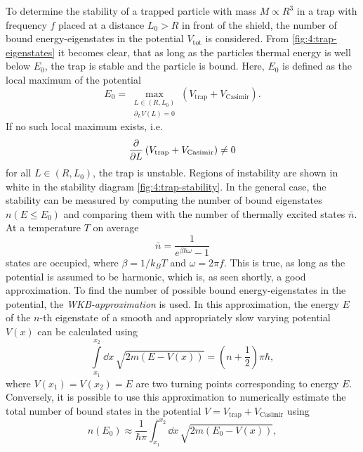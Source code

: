 To determine the stability of a trapped particle with mass $M \propto R^3$ in a trap with frequency $f$ placed at a distance $L_0 > R$ in front of the shield, the number of bound energy-eigenstates in the potential $V_\mathrm{tot}$ is considered.
From \cref{fig:4:trap-eigenstates} it becomes clear, that as long as the particles thermal energy is well below $E_0$, the trap is stable and the particle is bound.
Here, $E_0$ is defined as the local maximum of the potential 
\begin{equation}
  E_0 = \max_{\substack{L\in(R,L_0) \\ \partial_L V(L) = 0}} \left( V_\mathrm{trap} + V_\mathrm{Casimir} \right) .
\end{equation}
If no such local maximum exists, i.e.
\begin{equation}
  \pdv{L} \left( V_\mathrm{trap} + V_\mathrm{Casimir} \right) \neq 0
\end{equation}
for all $L \in (R, L_0)$, the trap is unstable.
Regions of instability are shown in white in the stability diagram \cref{fig:4:trap-stability}.
In the general case, the stability can be measured by computing the number of bound eigenstates $n(E \leq E_0)$ and comparing them with the number of thermally excited states $\bar{n}$.
At a temperature $T$ on average 
\begin{equation}
  \bar{n} = \frac{1}{e^{\beta \hbar \omega} - 1}
\end{equation}
states are occupied, where $\beta = 1/k_B T$ and $\omega = 2\pi f$. This is true, as long as the potential is assumed to be harmonic, which is, as seen shortly, a good approximation.
To find the number of possible bound energy-eigenstates in the potential, the \emph{WKB-approximation} is used.
In this approximation, the energy $E$ of the $n$-th eigenstate of a smooth and appropriately slow varying potential $V(x)$ can be calculated using \cite[p. 163]{Schleich_2001}
\begin{equation}
  \int\limits_{x_1}^{x_2} \dd x \, \sqrt{2m(E-V(x))} = \left(n + \frac{1}{2}\right)\pi\hbar ,
\end{equation}
where $V(x_1) = V(x_2) = E$ are two turning points corresponding to energy $E$.
Conversely, it is possible to use this approximation to numerically estimate the total number of bound states in the potential $V = V_\mathrm{trap} + V_\mathrm{Casimir}$ using
\begin{equation}
  n(E_0) \approx \frac{1}{\hbar \pi} \int_{x_1}^{x_2} \dd x \, \sqrt{2m(E_0 - V(x))},
\end{equation}
